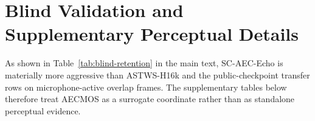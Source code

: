 \documentclass[journal]{IEEEtran}
\begin{document}
\section{Blind Validation and Supplementary Perceptual Details}
\label{app:aecmos-validation}
As shown in Table~\ref{tab:blind-retention} in the main text, SC-AEC-Echo is materially more aggressive than ASTWS-H16k and the public-checkpoint transfer rows on microphone-active overlap frames. The supplementary tables below therefore treat AECMOS as a surrogate coordinate rather than as standalone perceptual evidence.





\end{document}
